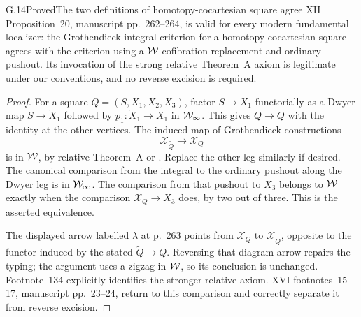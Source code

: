 \begin{claim}{G.14}{Proved}{The two definitions of homotopy-cocartesian square agree}
XII Proposition~20, manuscript pp.~262--264, is valid for every modern fundamental localizer: the Grothendieck-integral criterion for a homotopy-cocartesian square agrees with the criterion using a $\mathcal{W}$-cofibration replacement and ordinary pushout. Its invocation of the strong relative Theorem~A axiom is legitimate under our conventions, and no reverse excision is required.
\end{claim}
\begin{proof}
For a square $Q=(S,X_1,X_2,X_3)$, factor $S\to X_1$ functorially as a Dwyer map $S\to\widetilde X_1$ followed by $p_1:\widetilde X_1\to X_1$ in $\mathcal{W}_{\infty}$. This gives $\widetilde Q\to Q$ with the identity at the other vertices. The induced map of Grothendieck constructions
\[
\mathcal X_{\widetilde Q}\longrightarrow\mathcal X_Q
\]
is in $\mathcal{W}$, by relative Theorem~A or . Replace the other leg similarly if desired. The canonical comparison from the integral to the ordinary pushout along the Dwyer leg is in $\mathcal{W}_{\infty}$. The comparison from that pushout to $X_3$ belongs to $\mathcal{W}$ exactly when the comparison $\mathcal X_Q\to X_3$ does, by two out of three. This is the asserted equivalence.

The displayed arrow labelled $\lambda$ at p.~263 points from $\mathcal X_Q$ to $\mathcal X_{\widetilde Q}$, opposite to the functor induced by the stated $\widetilde Q\to Q$. Reversing that diagram arrow repairs the typing; the argument uses a zigzag in $\mathcal{W}$, so its conclusion is unchanged. Footnote~134 explicitly identifies the stronger relative axiom. XVI footnotes~15--17, manuscript pp.~23--24, return to this comparison and correctly separate it from reverse excision.
\end{proof}

